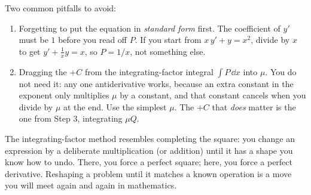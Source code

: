 \begin{trapbox}
Two common pitfalls to avoid:
\begin{enumerate}
\item Forgetting to put the equation in \emph{standard form} first. The coefficient
of $y'$ must be $1$ before you read off $P$. If you start from
$x\,y' + y = x^2$, divide by $x$ to get $y' + \tfrac1x y = x$, so $P=1/x$, not
something else.
\item Dragging the $+C$ from the integrating-factor integral $\int P\,\dd x$ into
$\mu$. You do not need it: any one antiderivative works, because an extra constant
in the exponent only multiplies $\mu$ by a constant, and that constant cancels when
you divide by $\mu$ at the end. Use the simplest $\mu$. The $+C$ that \emph{does}
matter is the one from Step 3, integrating $\mu Q$.
\end{enumerate}
\end{trapbox}

\begin{connectionbox}
The integrating-factor method resembles completing the square: you
change an expression by a deliberate multiplication (or addition) until it
has a shape you know how to undo. There, you force a perfect square; here,
you force a perfect derivative. Reshaping a problem until it matches a known
operation is a move you will meet again and again in mathematics.
\end{connectionbox}

